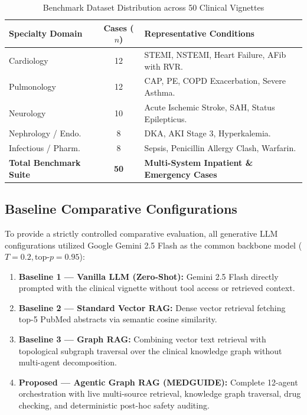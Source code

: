 \documentclass[journal,10pt,twocolumn]{IEEEtran}
\begin{document}
\begin{table}[!t]
\centering
\caption{Benchmark Dataset Distribution across 50 Clinical Vignettes}
\label{tab:vignettes}
\footnotesize
\setlength{\tabcolsep}{4pt}
\begin{tabularx}{\columnwidth}{>{\raggedright\arraybackslash}p{2.4cm}c>{\raggedright\arraybackslash}X}
\toprule
\textbf{Specialty Domain} & \textbf{Cases ($n$)} & \textbf{Representative Conditions} \\
\midrule
Cardiology & 12 & STEMI, NSTEMI, Heart Failure, AFib with RVR. \\
Pulmonology & 12 & CAP, PE, COPD Exacerbation, Severe Asthma. \\
Neurology & 10 & Acute Ischemic Stroke, SAH, Status Epilepticus. \\
Nephrology / Endo. & 8 & DKA, AKI Stage 3, Hyperkalemia. \\
Infectious / Pharm. & 8 & Sepsis, Penicillin Allergy Clash, Warfarin. \\
\midrule
\textbf{Total Benchmark Suite} & \textbf{50} & \textbf{Multi-System Inpatient \& Emergency Cases} \\
\bottomrule
\end{tabularx}
\end{table}

\subsection{Baseline Comparative Configurations}
To provide a strictly controlled comparative evaluation, all generative LLM configurations utilized Google Gemini 2.5 Flash as the common backbone model ($T=0.2, \text{top-}p=0.95$):
\begin{enumerate}
    \item \textbf{Baseline 1 --- Vanilla LLM (Zero-Shot):} Gemini 2.5 Flash directly prompted with the clinical vignette without tool access or retrieved context.
    \item \textbf{Baseline 2 --- Standard Vector RAG:} Dense vector retrieval fetching top-5 PubMed abstracts via semantic cosine similarity.
    \item \textbf{Baseline 3 --- Graph RAG:} Combining vector text retrieval with topological subgraph traversal over the clinical knowledge graph without multi-agent decomposition.
    \item \textbf{Proposed --- Agentic Graph RAG (MEDGUIDE):} Complete 12-agent orchestration with live multi-source retrieval, knowledge graph traversal, drug checking, and deterministic post-hoc safety auditing.
\end{enumerate}
\end{document}
